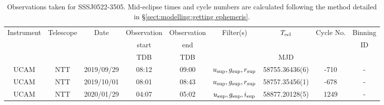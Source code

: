 \begin{table}
	\begin{center}
		\caption{Observations taken for SSSJ0522-3505. Mid-eclipse times and cycle numbers are calculated following the method detailed in \S\ref{sect:modelling:getting ephemeris}.}
		\label{table:observing:observation logs SSSJ0522-3505}
		\begin{tabular}{ccccccccc}
			\hline
			Instrument & Telescope & Date & Observation  & Observation  & Filter(s) & $T_{\rm ecl}$ & Cycle No. & Binning \\
			 &  &  &  start &  end &  &  &  & ID \\
			 &  &  & TDB & TDB &  & MJD &  &  \\
			\hline
			\hline
			UCAM & NTT & 2019/09/29 & 08:12    & 09:00    & $u_{\rm sup},g_{\rm sup},r_{\rm sup}$ & 58755.36436(6)  &  -710 & - \\
			UCAM & NTT & 2019/10/01 & 08:01    & 08:43    & $u_{\rm sup},g_{\rm sup},r_{\rm sup}$ & 58757.35456(1)  &  -678 & - \\
			UCAM & NTT & 2020/01/29 & 04:07    & 05:02    & $u_{\rm sup},g_{\rm sup},i_{\rm sup}$ & 58877.20128(5)  &  1249 & - \\
		   \hline
		\end{tabular}
	\end{center}
\end{table}